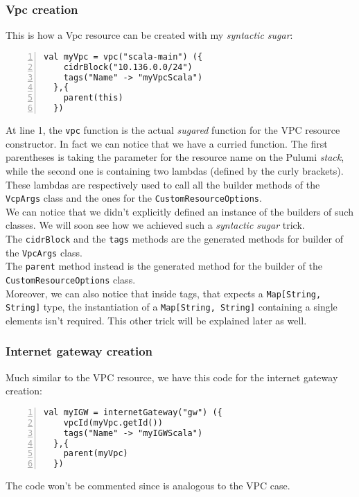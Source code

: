 \subsubsection{Vpc creation}
\label{sssec:vpc-creation-scala}
This is how a Vpc resource can be created with my \textit{syntactic sugar}:\\
\begin{minipage}{\linewidth}
\begin{lstlisting}[numbers=left, numberstyle=\tiny, numbersep=-5pt, stepnumber=1]
  val myVpc = vpc("scala-main") ({
    cidrBlock("10.136.0.0/24")
    tags("Name" -> "myVpcScala")
  },{
    parent(this)
  })
\end{lstlisting}
\end{minipage}
At line 1, the \texttt{vpc} function is the actual \textit{sugared} function for the VPC resource constructor.
In fact we can notice that we have a curried function.
The first parentheses is taking the parameter for the resource name on the Pulumi \textit{stack}, while the second one is containing two lambdas (defined by the curly brackets).
These lambdas are respectively used to call all the builder methods of the \texttt{VcpArgs} class and the ones for the \texttt{CustomResourceOptions}.\\
We can notice that we didn't explicitly defined an instance of the builders of such classes.
We will soon see how we achieved such a \textit{syntactic sugar} trick.\\
The \texttt{cidrBlock} and the \texttt{tags} methods are the generated methods for builder of the \texttt{VpcArgs} class.\\ 
The \texttt{parent} method instead is the generated method for the builder of the \texttt{CustomResourceOptions} class.\\
Moreover, we can also notice that inside tags, that expects a \texttt{Map[String, String]} type, the instantiation of a \texttt{Map[String, String]} containing a single elements isn't required.
This other trick will be explained later as well.

\subsubsection{Internet gateway creation}
Much similar to the VPC resource, we have this code for the internet gateway creation:\\
\begin{minipage}{\linewidth}
\begin{lstlisting}[numbers=left, numberstyle=\tiny, numbersep=-5pt, stepnumber=1]
  val myIGW = internetGateway("gw") ({
    vpcId(myVpc.getId())
    tags("Name" -> "myIGWScala")
  },{
    parent(myVpc)
  })
\end{lstlisting}
\end{minipage}
The code won't be commented since is analogous to the VPC case.

